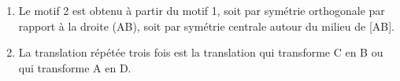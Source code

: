 
\medskip

%
%
%
%

\begin{enumerate}
	\item %
Le motif 2 est obtenu à partir du motif 1, soit par symétrie orthogonale par rapport à la droite (AB), soit par symétrie centrale autour du milieu de [AB].
	
	\item %
	
	
	
La translation répétée trois fois est la translation qui transforme C en B ou qui transforme A en D.
\end{enumerate}

\vspace{5mm}

